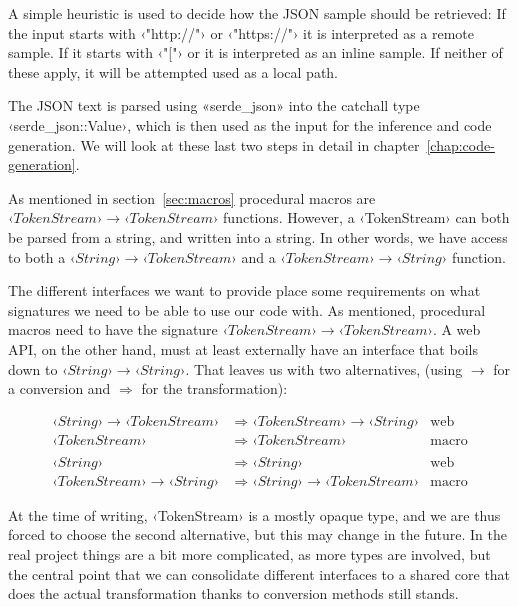 A simple heuristic is used to decide how the JSON sample should be retrieved: If the input starts with  ‹"http://"› or ‹"https://"› it is interpreted as a remote sample. If it starts with ‹"["› or  it is interpreted as an inline sample. If neither of these apply, it will be attempted used as a local path.

The JSON text is parsed using «serde_json» into the catchall type ‹serde_json::Value›, which is then used as the input for the inference and code generation. We will look at these last two steps in detail in chapter~\ref{chap:code-generation}.

As mentioned in section~\ref{sec:macros} procedural macros are $ ‹TokenStream› \rightarrow ‹TokenStream› $ functions. However, a ‹TokenStream› can both be parsed from a string, and written into a string. In other words, we have access to both a $ ‹String› \rightarrow ‹TokenStream› $ and a $ ‹TokenStream› \rightarrow ‹String› $ function.

The different interfaces we want to provide place some requirements on what signatures we need to be able to use our code with. As mentioned, procedural macros need to have the signature $ ‹TokenStream› \rightarrow ‹TokenStream› $. A web API, on the other hand, must at least externally have an interface that boils down to $ ‹String› \rightarrow ‹String› $. That leaves us with two alternatives, (using $\rightarrow$ for a conversion and $\Rightarrow$ for the transformation):

\begin{align*}
‹String› \rightarrow ‹TokenStream› &\Rightarrow ‹TokenStream› \rightarrow ‹String› & \text{web} \\
                   ‹TokenStream› &\Rightarrow ‹TokenStream›                    & \text{macro} \\
\\
                        ‹String› &\Rightarrow ‹String›                         & \text{web} \\
‹TokenStream› \rightarrow ‹String› &\Rightarrow ‹String› \rightarrow ‹TokenStream› & \text{macro}
\end{align*}

At the time of writing, ‹TokenStream› is a mostly opaque type, and we are thus forced to choose the second alternative, but this may change in the future. In the real project things are a bit more complicated, as more types are involved, but the central point that we can consolidate different interfaces to a shared core that does the actual transformation thanks to conversion methods still stands.

